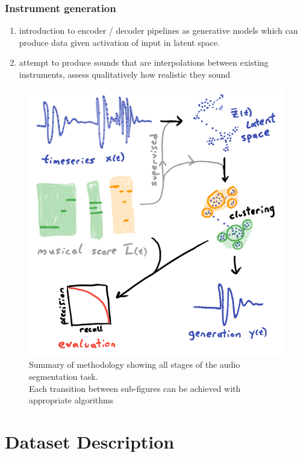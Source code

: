 \documentclass{article}[12pt]
\numberwithin{equation}{section}
\begin{document}
\subsubsection{Instrument generation}
\begin{enumerate}
	\item introduction to encoder / decoder pipelines as generative models which
	can produce data given activation of input in latent space.
	\item attempt to produce sounds that are interpolations between
	existing instruments, assess qualitatively how realistic they sound
\end{enumerate}


\begin{figure}[H]
\centering{}
\captionsetup{justification=centering}
\includegraphics[scale=0.5]{methods}
\caption{Summary of methodology showing all stages of the audio segmentation task.\\
Each transition between sub-figures can be achieved with appropriate algorithms
}
\label{fig:methods}
\end{figure}

\section{Dataset Description}
\end{document}

